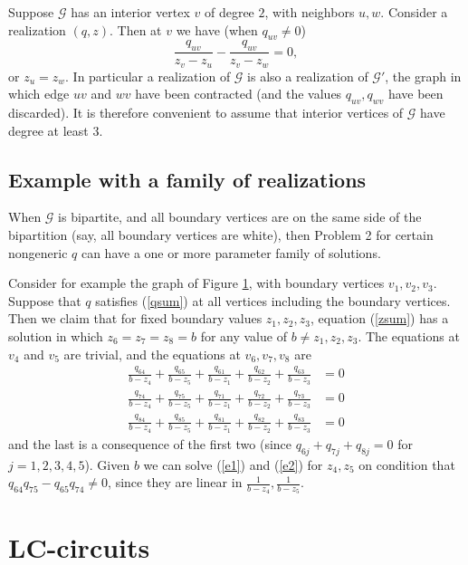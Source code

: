 \documentclass[12pt]{amsart}
\newcommand{\G}{{\mathcal G}}
\begin{document}
Suppose $\G$ has an interior vertex $v$ of degree $2$, with neighbors $u,w$. Consider a realization $(q,z)$. 
Then at $v$ we have (when $q_{uv}\ne0$)
$$\frac{q_{uv}}{z_v-z_u} - \frac{q_{uv}}{z_v-z_w} = 0,$$
or $z_u=z_w$. In particular a realization of $\G$ is also a realization of $\G'$, the graph in which edge $uv$ and $wv$ have been contracted
(and the values $q_{uv},q_{wv}$ have been discarded).
It is therefore convenient to assume that interior vertices of $\G$ have degree at least $3$.


\subsection{Example with a family of realizations}

When $\G$ is bipartite, and all boundary vertices are on the same side of the bipartition (say, all boundary vertices are white), 
then Problem 2 for certain nongeneric $q$ 
can have a one or more parameter family of solutions. 

\begin{figure}[htbp]
\caption{\label{332graph}}
\end{figure}
Consider for example the graph of Figure \ref{332graph}, with boundary vertices $v_1,v_2,v_3$. Suppose that $q$ satisfies
(\ref{qsum}) at all vertices including the boundary vertices. Then we claim that for fixed boundary values $z_1,z_2,z_3$, equation (\ref{zsum})
has a solution in which $z_6=z_7=z_8=b$ for any value of $b\ne z_1,z_2,z_3$. 
The equations at $v_4$ and $v_5$ are trivial, and the equations at $v_6,v_7,v_8$ are
\begin{align}
\label{e1}\frac{q_{64}}{b-z_4}+\frac{q_{65}}{b-z_5}+\frac{q_{61}}{b-z_1}+\frac{q_{62}}{b-z_2}+\frac{q_{63}}{b-z_3}&=0\\
\label{e2}\frac{q_{74}}{b-z_4}+\frac{q_{75}}{b-z_5}+\frac{q_{71}}{b-z_1}+\frac{q_{72}}{b-z_2}+\frac{q_{73}}{b-z_3}&=0\\
\label{e3}\frac{q_{84}}{b-z_4}+\frac{q_{85}}{b-z_5}+\frac{q_{81}}{b-z_1}+\frac{q_{82}}{b-z_2}+\frac{q_{83}}{b-z_3}&=0
\end{align}
and the last is a consequence of the first two (since $q_{6j}+q_{7j}+q_{8j}=0$ for $j=1,2,3,4,5$).
Given $b$ we can solve (\ref{e1}) and (\ref{e2}) for $z_4,z_5$ on condition that $q_{64}q_{75}-q_{65}q_{74}\ne0$,
since they are linear in $\frac1{b-z_4},\frac1{b-z_5}$.


\section{LC-circuits}\label{LCcircuitsection}
\end{document}
